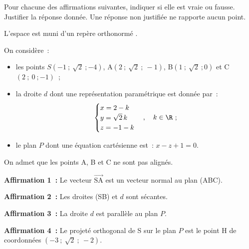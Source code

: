 Pour chacune des affirmations suivantes, indiquer si elle est vraie ou fausse. Justifier la réponse donnée. Une réponse non justifiée ne rapporte aucun point.

L'espace est muni d'un repère orthonormé \Oijk.

On considère~:

\begin{itemize}[noitemsep]
\item les points $S(-1~;~\sqrt{2}~;-4)$, A$(2~;~\sqrt{2}~;~-1)$, B$(1~;~\sqrt{2}~;0)$ et C$(2~;~0~;-1)$~;
\item la droite $d$ dont une représentation paramétrique est donnée par~:
\[
\begin{cases}
x = 2-k\\
y = \sqrt{2}\,k\\
z = -1-k
\end{cases}, \quad k \in \R~;
\]
\item le plan $P$ dont une équation cartésienne est~: $x - z + 1 = 0$.
\end{itemize}

On admet que les points A, B et C ne sont pas alignés.

\textbf{Affirmation 1~:} Le vecteur $\overrightarrow{\text{SA}}$ est un vecteur normal au plan (ABC).

\textbf{Affirmation 2~:} Les droites (SB) et $d$ sont sécantes.

\textbf{Affirmation 3~:} La droite $d$ est parallèle au plan $P$.

\textbf{Affirmation 4~:} Le projeté orthogonal de S sur le plan $P$ est le point H de coordonnées $(-3~;~\sqrt{2}~;~-2)$.
